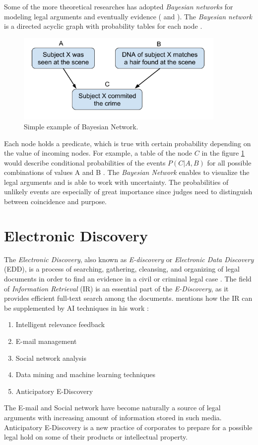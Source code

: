 \documentclass[
  digital, %
  notable,   %
  nolof,     %
  nolot,     %
]{fithesis3}
\begin{document}
Some of the more theoretical researches has adopted \textit{Bayesian networks} for modeling legal arguments and eventually evidence (\cite{Fenton2012bayes} and \cite{Vlek2016bayes}).
The \textit{Bayesian network} is a directed acyclic graph with probability tables for each node \cite{Vlek2016bayes}.
\begin{figure}[H]
\caption{Simple example of Bayesian Network.}
\label{fig:bayesianNetwork}
\includegraphics[width=0.9\textwidth]{img/Bayesian_Network}
\end{figure}
Each node holds a predicate, which is true with certain probability depending on the value of incoming nodes.
For example, a table of the node $C$ in the figure \ref{fig:bayesianNetwork} would describe conditional probabilities of the events $P(C | A, B)$ for all possible combinations of values A and B \cite{Vlek2016bayes}.
The \textit{Bayesian Network} enables to visualize the legal arguments and is able to work with uncertainty.
The probabilities of unlikely events are especially of great importance since judges need to distinguish between coincidence and purpose.

\section{Electronic Discovery}
The \textit{Electronic Discovery}, also known as \textit{E-discovery} or \textit{Electronic Data Discovery} (EDD), is a process of searching, gathering, cleansing, and organizing of legal documents in order to find an evidence in a civil or criminal legal case \cite{Conrad2010ediscovery}.
The field of \textit{Information Retrieval} (IR) is an essential part of the \textit{E-Discovery}, as it provides efficient full-text search among the documents.
\citeauthor{Conrad2010ediscovery} mentions how the IR can be supplemented by AI techniques in his work  \cite{Conrad2010ediscovery}:
\begin{enumerate}
\item Intelligent relevance feedback
\item E-mail management
\item Social network analysis
\item Data mining and machine learning techniques
\item Anticipatory E-Discovery
\end{enumerate}
The E-mail and Social network have become naturally a source of legal arguments with increasing amount of information stored in such media.
Anticipatory E-Discovery is a new practice of corporates to prepare for a possible legal hold on some of their products or intellectual property.
\end{document}
